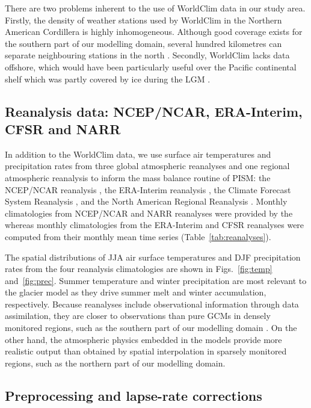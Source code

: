 \documentclass[tc, ms]{copernicus}
\begin{document}
There are two problems inherent to the use of WorldClim data in our study area. Firstly, the density of weather stations used by WorldClim in the Northern American Cordillera is highly inhomogeneous. Although good coverage exists for the southern part of our modelling domain, several hundred kilometres can separate neighbouring stations in the north \citep{data:worldclim}. Secondly, WorldClim lacks data offshore, which would have been particularly useful over the Pacific continental shelf which was partly covered by ice during the LGM \citep{jackson-clague-1991}.

\subsection{Reanalysis data: NCEP/NCAR, ERA-Interim, CFSR and NARR}

In addition to the WorldClim data, we use surface air temperatures and precipitation rates from three global atmospheric reanalyses and one regional atmospheric reanalysis to inform the mass balance routine of PISM: the NCEP/NCAR reanalysis \citep{data:ncar}, the ERA-Interim reanalysis \citep{data:erai}, the Climate Forecast System Reanalysis \citep[CFSR;][]{data:cfsr}, and the North American Regional Reanalysis \citep[NARR;][]{data:narr}. Monthly climatologies from NCEP/NCAR and NARR reanalyses were provided by the \citet{web:psd} whereas monthly climatologies from the ERA-Interim and CFSR reanalyses were computed from their monthly mean time series (Table~\ref{tab:reanalyses}).

The spatial distributions of JJA air surface temperatures and DJF precipitation rates from the four reanalysis climatologies are shown in Figs.~\ref{fig:temp} and~\ref{fig:prec}. Summer temperature and winter precipitation are most relevant to the glacier model as they drive summer melt and winter accumulation, respectively. Because reanalyses include observational information through data assimilation, they are closer to observations than pure GCMs in densely monitored regions, such as the southern part of our modelling domain \citep{bengtsson-etal-2007}. On the other hand, the atmospheric physics embedded in the models provide more realistic output than obtained by spatial interpolation in sparsely monitored regions, such as the northern part of our modelling domain.

\subsection{Preprocessing and lapse-rate corrections}
\end{document}

